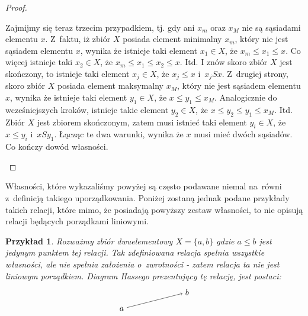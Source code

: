 \documentclass[12pt,a4paper]{report}
\newtheorem{example}{Przykład}
\begin{document}
\begin{proof}
\begin{enumerate}
\begin{itemize}
Zajmijmy się teraz trzecim przypadkiem, tj. gdy ani $x_m$ oraz $x_M$ nie są sąsiadami elementu $x$. Z~faktu, iż zbiór $X$ posiada element minimalny $x_m$, który nie jest sąsiadem elementu $x$, wynika że istnieje taki element $x_1 \in X$, że $x_m \leq x_1 \leq x$. Co więcej istnieje taki $x_2 \in X$, że $x_m \leq x_1 \leq x_2 \leq x.$ Itd. I znów skoro zbiór $X$ jest skończony, to istnieje taki element $x_j \in X$, że $x_j \leq x$ i~$x_jSx$. Z~drugiej strony, skoro zbiór $X$ posiada element maksymalny $x_M$, który nie jest sąsiadem elementu $x$, wynika że istnieje taki element $y_1 \in X$, że $x \leq y_1 \leq x_M$. Analogicznie do wcześniejszych kroków, istnieje takie element $y_2 \in X$, że $x \leq y_2 \leq y_1 \leq x_M$. Itd.  Zbiór $X$ jest zbiorem skończonym, zatem musi istnieć taki element $y_i \in X$, że $x \leq y_i$ i~$xSy_1$. 
Łącząc te dwa warunki, wynika że $x$ musi mieć dwóch sąsiadów. Co kończy dowód własności.

\end{itemize}

\end{enumerate}
\end{proof}

Własności, które wykazaliśmy powyżej są często podawane niemal na~równi z~definicją takiego uporządkowania. Poniżej zostaną jednak podane przykłady takich relacji, które mimo, że posiadają powyższy zestaw własności, to nie opisują relacji będących porządkami liniowymi. 
 
\begin{example}
Rozważmy zbiór dwuelementowy $X = \{ a, b \}$ gdzie $a \leq b$ jest jedynym punktem tej relacji. Tak zdefiniowana relacja spełnia wszystkie własności, ale nie spełnia założenia o~zwrotności - zatem relacja ta nie jest liniowym porządkiem. Diagram Hassego prezentujący tę relację, jest postaci: 
$$
\begin{tikzpicture}[scale=.7]
  \node (a) at (-2,0) {$a$};
  \node (b) at (2,1) {$b$};
  \draw [->](a)--(b) ;
\end{tikzpicture}
$$
\end{example}
\end{document}
